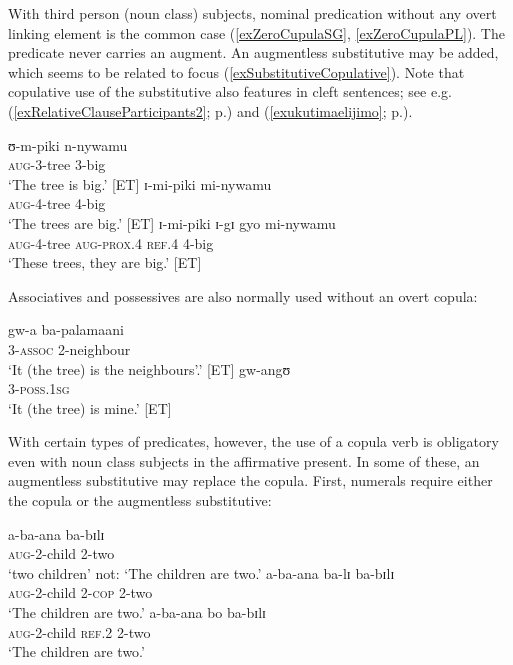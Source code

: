 With third person (noun class) subjects, nominal predication without any overt linking element is the common case (\ref{exZeroCupulaSG}, \ref{exZeroCupulaPL}). The predicate never carries an augment. An augmentless substitutive may be added, which seems to be related to focus (\ref{exSubstitutiveCopulative}). Note that copulative use of the substitutive also features in cleft sentences; see e.g. (\ref{exRelativeClauseParticipants2}; p.\nobreakspace\pageref{exRelativeClauseParticipants2}) and (\ref{exukutimaelijimo}; p.\nobreakspace\pageref{exukutimaelijimo}). 

\begin{exe}
\ex \begin{xlist}
\ex \label{exZeroCupulaSG}\gll ʊ-m-piki n-nywamu\\
\textsc{aug}-3-tree 3-big\\
\glt `The tree is big.' [ET]
\ex \label{exZeroCupulaPL}\gll ɪ-mi-piki mi-nywamu\\
\textsc{aug}-4-tree 4-big\\
\glt `The trees are big.' [ET]
\ex \label{exSubstitutiveCopulative} \gll ɪ-mi-piki ɪ-gɪ gyo mi-nywamu\\
\textsc{aug}-4-tree \textsc{aug}-\textsc{prox.4} \textsc{ref.4} 4-big\\
\glt \lq These trees, they are big.' [ET]
\end{xlist}
\end{exe}
Associatives and possessives are also normally used without an overt copula:

\begin{exe}
\ex \gll gw-a ba-palamaani\\
3-\textsc{assoc} 2-neighbour\\
\glt \lq It (the tree) is the neighbours'.' [ET]
\ex \gll gw-angʊ\\
3-\textsc{poss.1sg}\\
\glt \lq It (the tree) is mine.' [ET]
\end{exe}

With certain types of predicates, however, the use of a copula verb is obligatory even with noun class subjects in the affirmative present. In some of these, an augmentless substitutive may replace the copula. First, numerals require either the copula or the augmentless substitutive:
\begin{exe}
\ex
\begin{xlist}
\ex \gll a-ba-ana ba-bɪlɪ\\
\textsc{aug}-2-child 2-two\\
\glt \lq two children' not: \lq The children are two.'
\ex \gll a-ba-ana ba-lɪ ba-bɪlɪ\\
\textsc{aug}-2-child 2-\textsc{cop} 2-two\\
\glt \lq The children are two.'
\ex \gll a-ba-ana bo ba-bɪlɪ\\
\textsc{aug}-2-child \textsc{ref.2} 2-two\\
\glt \lq The children are two.'
\end{xlist}
\end{exe}

